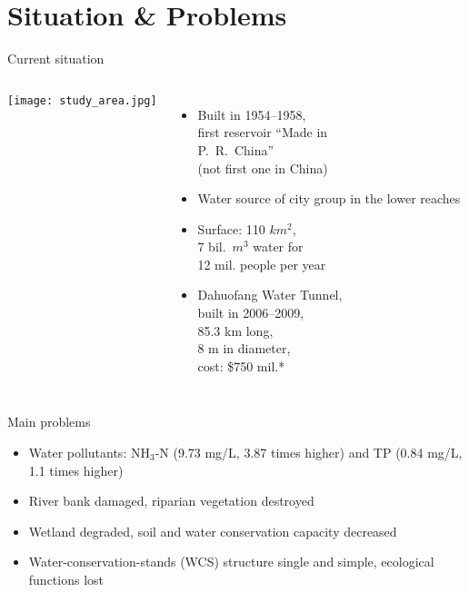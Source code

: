 \section{Situation \& Problems}
{
\begin{frame}[t]{Current situation}
\begin{columns}[T]
\texttt{[image: study\_area.jpg]}
	\begin{itemize}
		\item Built in 1954--1958,\\first reservoir ``Made in\\ P.\ R.\ China''\\(not first one in China)
		\item Water source of city group in the lower reaches		
		\item Surface: 110 $km^2$,\\ 7 bil.\ $m^3$ water for\\ \alert{12 mil.} people per year
		\item Dahuofang Water Tunnel,\\built in 2006--2009,\\85.3 km long,\\8 m in diameter,\\\alert{cost: \$750 mil.}*
	\end{itemize}
\end{columns}
 \end{frame}
}

\begin{frame}[t]{Main problems}
	\begin{itemize}[<+- | alert@+>]
		\item Water pollutants: NH$_3$-N (9.73 mg/L, 3.87 times higher) and TP (0.84 mg/L, 1.1 times higher)
		\item River bank damaged, riparian vegetation destroyed
		\item Wetland degraded, soil and water conservation capacity decreased
		\item Water-conservation-stands (WCS) structure single and simple, ecological functions lost
	\end{itemize}

\begin{columns}[T]
		
	
\end{columns}
\end{frame}